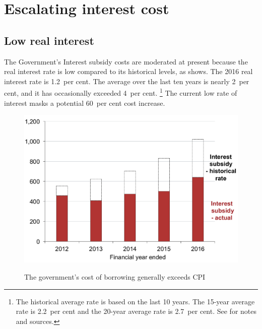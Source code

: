 \documentclass[embargoed]{grattan}
\begin{document}
\section{Escalating interest cost}\label{escalating-interest-cost}

\subsection{Low real interest}\label{low-real-interest}

The Government's \gls{Interest subsidy} costs are moderated at present because the real interest rate is low compared to its historical levels, as  shows.
The 2016 real interest rate is 1.2~per cent.
The average over the last ten years is nearly 2~per cent, and it has occasionally exceeded 4~per cent.%
\footnote{The historical average rate is based on the last 10 years.
The 15-year average rate is 2.2~per cent and the 20-year average rate is 2.7~per cent. See   for notes and sources.
} The current low rate of interest masks a potential 60~per cent cost increase.

\begin{figure}[t]\vspace{1pt}
\caption[The government's cost of borrowing generally exceeds CPI]{The government's cost of borrowing generally exceeds \gls{CPI}}\label{fig:fig2-governments-cost-of-borrowing-exceeds-CPI}

\includegraphics[page=2]{atlas/Chartpack.pdf}

%
{\textcites{ABS2016ConsumerPriceIndex}{RBA-2015-f2Capitalmarketyields}{RBA2016F21Capitalmarket}}
\end{figure}
\end{document}
